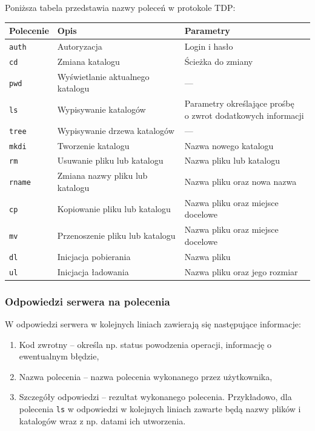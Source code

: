 \documentclass[10pt,a4paper]{article}
\begin{document}
Poniższa tabela przedstawia nazwy poleceń w protokole TDP:
\begin{center}
    \begin{tabular}{l|l|l}
        \textbf{Polecenie} & \textbf{Opis} & \textbf{Parametry} \\
        \hline
        \texttt{auth} & Autoryzacja & Login i hasło \\
        \hline
        \texttt{cd} & Zmiana katalogu & Ścieżka do zmiany \\
        \hline
        \texttt{pwd} & Wyświetlanie aktualnego katalogu & --- \\
        \hline
        \texttt{ls} & Wypisywanie katalogów & \makecell[lt]{Parametry określające prośbę\\o zwrot dodatkowych informacji} \\
        \hline
        \texttt{tree} & Wypisywanie drzewa katalogów & --- \\
        \hline
        \texttt{mkdi} & Tworzenie katalogu & Nazwa nowego katalogu \\
        \hline
        \texttt{rm} & Usuwanie pliku lub katalogu & Nazwa pliku lub katalogu \\
        \hline
        \texttt{rname} & Zmiana nazwy pliku lub katalogu & Nazwa pliku oraz nowa nazwa \\
        \hline
        \texttt{cp} & Kopiowanie pliku lub katalogu & Nazwa pliku oraz miejsce docelowe \\
        \hline
        \texttt{mv} & Przenoszenie pliku lub katalogu & Nazwa pliku oraz miejsce docelowe \\
        \hline
        \texttt{dl} & Inicjacja pobierania & Nazwa pliku \\
        \hline
        \texttt{ul} & Inicjacja ładowania & Nazwa pliku oraz jego rozmiar \\
    \end{tabular}
\end{center}

\subsubsection{Odpowiedzi serwera na polecenia}
\noindent W odpowiedzi serwera w kolejnych liniach zawierają się następujące informacje:
\begin{enumerate}
    \item Kod zwrotny -- określa np. status powodzenia operacji, informację o ewentualnym błędzie,
    \item Nazwa polecenia -- nazwa polecenia wykonanego przez użytkownika,
    \item Szczegóły odpowiedzi -- rezultat wykonanego polecenia. Przykładowo, dla polecenia \texttt{ls} w odpowiedzi w kolejnych liniach zawarte będą nazwy plików i katalogów wraz z np. datami ich utworzenia.
\end{enumerate}
\end{document}
